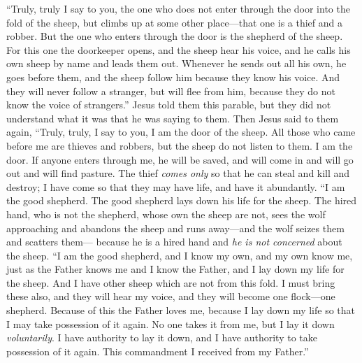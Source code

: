 \begin{biblechapter} %
 “Truly, truly I say to you, the one who does not enter through the door into the fold of the sheep, but climbs up at some other place—that one is a thief and a robber.
\verse But the one who enters through the door is the shepherd of the sheep.
\verse For this one the doorkeeper opens, and the sheep hear his voice, and he calls his own sheep by name and leads them out.
\verse Whenever he sends out all his own, he goes before them, and the sheep follow him because they know his voice.
\verse And they will never follow a stranger, but will flee from him, because they do not know the voice of strangers.”
\verse Jesus told them this parable, but they did not understand what it was that he was saying to them.
\verse Then Jesus said to them again, “Truly, truly, I say to you, I am the door of the sheep.
\verse All those who came before me are thieves and robbers, but the sheep do not listen to them.
\verse I am the door. If anyone enters through me, he will be saved, and will come in and will go out and will find pasture.
\verse The thief \textit{comes only} so that he can steal and kill and destroy; I have come so that they may have life, and have it abundantly.
\verse “I am the good shepherd. The good shepherd lays down his life for the sheep.
\verse The hired hand, who is not the shepherd, whose own the sheep are not, sees the wolf approaching and abandons the sheep and runs away—and the wolf seizes them and scatters them—
\verse because he is a hired hand and \textit{he is not concerned} about the sheep.
\verse “I am the good shepherd, and I know my own, and my own know me,
\verse just as the Father knows me and I know the Father, and I lay down my life for the sheep.
\verse And I have other sheep which are not from this fold. I must bring these also, and they will hear my voice, and they will become one flock—one shepherd.
\verse Because of this the Father loves me, because I lay down my life so that I may take possession of it again.
\verse No one takes it from me, but I lay it down \textit{voluntarily}. I have authority to lay it down, and I have authority to take possession of it again. This commandment I received from my Father.”

\end{biblechapter}
